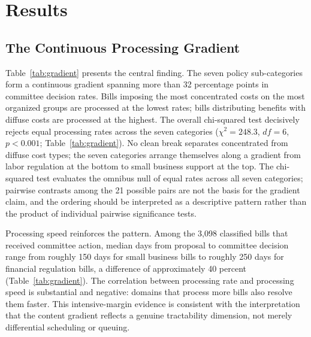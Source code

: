 \documentclass[11pt]{article}
\begin{document}

\section{Results}
\label{sec:results}

\subsection{The Continuous Processing Gradient}

Table~\ref{tab:gradient} presents the central finding. The seven policy sub-categories form a continuous gradient spanning more than 32 percentage points in committee decision rates. Bills imposing the most concentrated costs on the most organized groups are processed at the lowest rates; bills distributing benefits with diffuse costs are processed at the highest. The overall chi-squared test decisively rejects equal processing rates across the seven categories ($\chi^2 = 248.3$, $df = 6$, $p < 0.001$; Table~\ref{tab:gradient}). No clean break separates concentrated from diffuse cost types; the seven categories arrange themselves along a gradient from labor regulation at the bottom to small business support at the top. The chi-squared test evaluates the omnibus null of equal rates across all seven categories; pairwise contrasts among the 21 possible pairs are not the basis for the gradient claim, and the ordering should be interpreted as a descriptive pattern rather than the product of individual pairwise significance tests.

Processing speed reinforces the pattern. Among the 3,098 classified bills that received committee action, median days from proposal to committee decision range from roughly 150 days for small business bills to roughly 250 days for financial regulation bills, a difference of approximately 40 percent (Table~\ref{tab:gradient}). The correlation between processing rate and processing speed is substantial and negative: domains that process more bills also resolve them faster. This intensive-margin evidence is consistent with the interpretation that the content gradient reflects a genuine tractability dimension, not merely differential scheduling or queuing.
\end{document}

